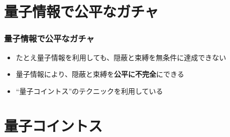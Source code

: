 \section{量子情報で公平なガチャ}

\begin{frame}
  \frametitle{量子情報で公平なガチャ}

  \begin{itemize}
    \item<2-> たとえ量子情報を利用しても、隠蔽と束縛を無条件に達成できない
    \item<3-> 量子情報により、隠蔽と束縛を\textbf{公平に不完全}にできる
  \end{itemize}


  \begin{itemize}
    \item<5-> ``量子コイントス''\cite{AMBAINIS2004398,PhysRevA.80.062321}のテクニックを利用している
  \end{itemize}

\end{frame}

\section{量子コイントス}

